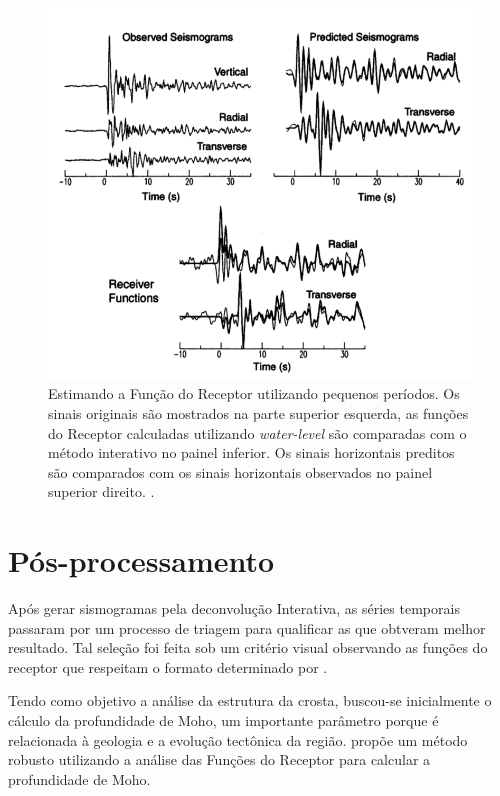 \begin{figure}[!ht]
\centering
\includegraphics[scale=0.5]{Figs/deconvolucao_interativa.png}
\caption[Estimando a Função do Receptor utilizando pequenos períodos.]{Estimando a Função do Receptor utilizando pequenos períodos. Os sinais originais são mostrados na parte superior esquerda, as funções do Receptor calculadas utilizando \textit{water-level} são comparadas com o método interativo no painel inferior. Os sinais horizontais preditos são comparados com os sinais horizontais observados no painel superior direito. \citep{ligorria_iterative_1999}.}
\label{deconvolucao_interativa}
\end{figure}

\section{Pós-processamento}

Após gerar sismogramas pela deconvolução Interativa, as séries temporais passaram por um processo de triagem para qualificar as que obtveram melhor resultado. Tal seleção foi feita sob um critério visual observando as funções do receptor que respeitam o formato determinado por \citep{langston_structure_1979}.

Tendo como objetivo a análise da estrutura da crosta, buscou-se inicialmente o cálculo da profundidade de Moho, um importante parâmetro porque é relacionada à geologia e a evolução tectônica da região. \cite{Zhu_Kanamori_2000} propõe um método robusto utilizando a análise das Funções do Receptor para calcular a profundidade de Moho.

